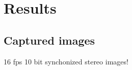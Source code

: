 \chapter{Results}
\label{chap:results}



\section{Captured images}
16 fps 10 bit synchonized stereo images!


\pagebreak

